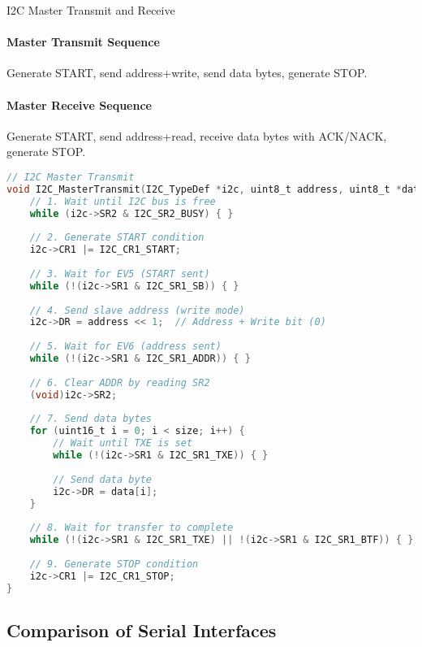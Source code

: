 \begin{KR}{I2C Master Transmit and Receive}
\paragraph{Master Transmit Sequence}
Generate START, send address+write, send data bytes, generate STOP.
\paragraph{Master Receive Sequence}
Generate START, send address+read, receive data bytes with ACK/NACK, generate STOP.

\begin{lstlisting}[language=C, style=basesmol]
// I2C Master Transmit
void I2C_MasterTransmit(I2C_TypeDef *i2c, uint8_t address, uint8_t *data, uint16_t size) {
    // 1. Wait until I2C bus is free
    while (i2c->SR2 & I2C_SR2_BUSY) { }
    
    // 2. Generate START condition
    i2c->CR1 |= I2C_CR1_START;
    
    // 3. Wait for EV5 (START sent)
    while (!(i2c->SR1 & I2C_SR1_SB)) { }
    
    // 4. Send slave address (write mode)
    i2c->DR = address << 1;  // Address + Write bit (0)
    
    // 5. Wait for EV6 (address sent)
    while (!(i2c->SR1 & I2C_SR1_ADDR)) { }
    
    // 6. Clear ADDR by reading SR2
    (void)i2c->SR2;
    
    // 7. Send data bytes
    for (uint16_t i = 0; i < size; i++) {
        // Wait until TXE is set
        while (!(i2c->SR1 & I2C_SR1_TXE)) { }
        
        // Send data byte
        i2c->DR = data[i];
    }
    
    // 8. Wait for transfer to complete
    while (!(i2c->SR1 & I2C_SR1_TXE) || !(i2c->SR1 & I2C_SR1_BTF)) { }
    
    // 9. Generate STOP condition
    i2c->CR1 |= I2C_CR1_STOP;
}
\end{lstlisting}
\end{KR}

\subsection{Comparison of Serial Interfaces}

